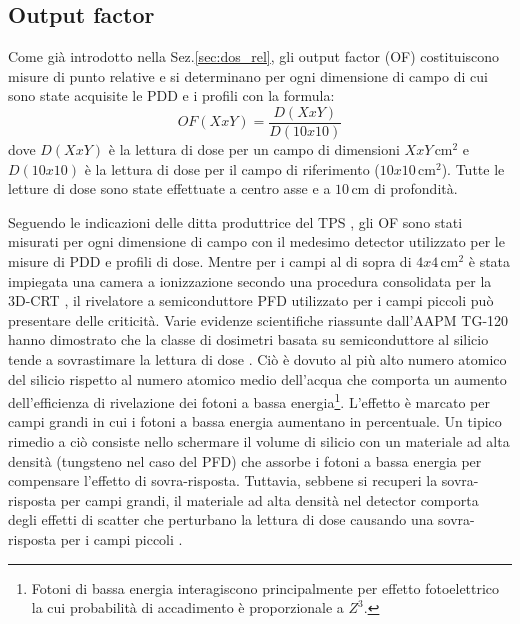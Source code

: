 \subsection{Output factor}
Come già introdotto nella Sez.\ref{sec:dos_rel}, gli output factor (OF) costituiscono misure di punto relative e si determinano per ogni dimensione di campo di cui sono state acquisite le PDD e i profili con la formula:
\begin{equation}
\label{eq:OF}
OF(XxY)=\frac{D(XxY)}{D(10x10)}
\end{equation}
dove $D(XxY)$ è la lettura di dose per un campo di dimensioni $XxY\,$cm$^2$ e $D(10x10)$ è la lettura di dose per il campo di riferimento ($10x10\,$cm$^2$). Tutte le letture di dose sono state effettuate a centro asse e a $10\,$cm di profondità.

Seguendo le indicazioni delle ditta produttrice del TPS \cite{RaySearchLaboratories2014}, gli OF sono stati misurati per ogni dimensione di campo con il medesimo detector utilizzato per le misure di PDD e profili di dose. Mentre per i campi al di sopra di $4x4\,$cm$^2$ è stata impiegata una camera a ionizzazione secondo una procedura consolidata per la 3D-CRT \cite{Andreo2006}, il rivelatore a semiconduttore PFD utilizzato per i campi piccoli può presentare delle criticità. Varie evidenze scientifiche riassunte dall'AAPM TG-120 \cite{Low2011} hanno dimostrato che la classe di dosimetri basata su semiconduttore al silicio tende a sovrastimare la lettura di dose \cite{Low2011}. Ciò è dovuto al più alto numero atomico del silicio rispetto al numero atomico medio dell'acqua che comporta un aumento dell'efficienza di rivelazione dei fotoni a bassa energia\footnote{Fotoni di bassa energia interagiscono principalmente per effetto fotoelettrico la cui probabilità di accadimento è proporzionale a $Z^3$.}. L'effetto è marcato per campi grandi in cui i fotoni a bassa energia aumentano in percentuale. Un tipico rimedio a ciò consiste nello schermare il volume di silicio con un materiale ad alta densità (tungsteno nel caso del PFD) che assorbe i fotoni a bassa energia per compensare l'effetto di sovra-risposta. Tuttavia, sebbene si recuperi la sovra-risposta per campi grandi, il materiale ad alta densità nel detector comporta degli effetti di scatter che perturbano la lettura di dose causando una sovra-risposta per i campi piccoli \cite{Griessbach2005}.

